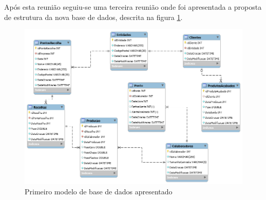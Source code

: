 Após esta reunião seguiu-se uma terceira reunião onde foi apresentada a proposta de estrutura da nova base de dados, descrita na figura \ref{fig:db_model old}.
\newpage
\begin{figure}[H] 
    \begin{center}
    \includegraphics[width=\textwidth,keepaspectratio]{figuras/DB_Model/old.png}
    \caption{Primeiro modelo de base de dados apresentado}\label{fig:db_model old} 
    \end{center}
\end{figure}

